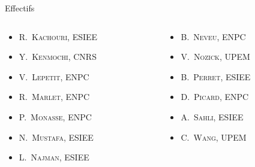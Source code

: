 \documentclass[]{beamer}
\begin{document}
\begin{frame}
\begin{block}{Effectifs}
\begin{overprint}
      \begin{columns}
        \begin{column}{0.5\textwidth}
          \begin{itemize}
            \item \textsc{R.~Kachouri}, ESIEE
            \item \textsc{Y.~Kenmochi}, CNRS
            \item \textcolor{Nouveau}{\textsc{V.~Lepetit}, ENPC}
            \item \textsc{R.~Marlet}, ENPC
            \item \textsc{P.~Monasse}, ENPC
            \item \textsc{N.~Mustafa}, ESIEE
            \item \textsc{L.~Najman}, ESIEE
          \end{itemize}
        \end{column}
        \begin{column}{0.5\textwidth}
          \begin{itemize}
            \item \textsc{B.~Neveu}, ENPC
            \item \textsc{V.~Nozick}, UPEM
            \item \textsc{B.~Perret}, ESIEE
            \item \textsc{D.~Picard}, ENPC
            \item \textsc{A.~Sahli}, ESIEE
            \item \textsc{C.~Wang}, UPEM
          \end{itemize}
        \end{column}
      \end{columns}
    \end{overprint}
  \end{block}
\end{frame}

\end{document}

